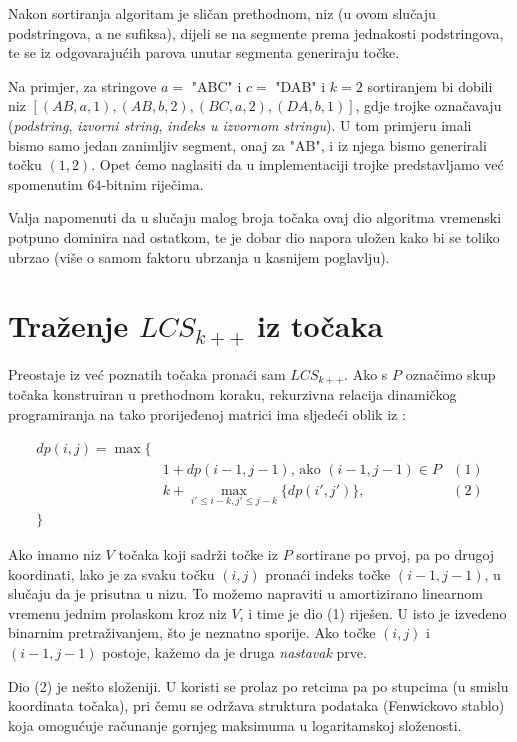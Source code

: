 \documentclass[times, utf8, seminar, numeric]{fer}
\begin{document}
Nakon sortiranja algoritam je sličan prethodnom, niz (u ovom slučaju
podstringova, a ne sufiksa), dijeli se na segmente prema jednakosti
podstringova, te se iz odgovarajućih parova unutar segmenta generiraju
točke.

Na primjer, za stringove $a =$ "ABC" i $c =$ "DAB" i $k = 2$
sortiranjem bi dobili niz $[(AB, a, 1), (AB, b, 2), (BC, a, 2), (DA,
  b, 1)]$, gdje trojke označavaju (\emph{podstring}, \emph{izvorni
  string}, \emph{indeks u izvornom stringu}). U tom primjeru imali
bismo samo jedan zanimljiv segment, onaj za "AB", i iz njega bismo
generirali točku $(1, 2)$. Opet ćemo naglasiti da u implementaciji
trojke predstavljamo već spomenutim $64$-bitnim riječima.

Valja napomenuti da u slučaju malog broja točaka ovaj dio algoritma
vremenski potpuno dominira nad ostatkom, te je dobar dio napora uložen
kako bi se toliko ubrzao (više o samom faktoru ubrzanja u kasnijem
poglavlju).

\section{Traženje $LCS_{k++}$ iz točaka}
Preostaje iz već poznatih točaka pronaći sam $LCS_{k++}$. Ako s $P$
označimo skup točaka konstruiran u prethodnom koraku, rekurzivna
relacija dinamičkog programiranja na tako prorijeđenoj matrici ima
sljedeći oblik iz \cite{Pavetic}:

\begin{align*}
  dp(i, j) = \max\{ \\
  &1 + dp(i-1, j-1) \text{, ako } (i-1, j-1) \in P     &       (1)\\
  &k + \max_{i' \le i - k, j' \le j - k}\{dp(i', j')\},    &      (2) \\ 
  \}
\end{align*}
  
Ako imamo niz $V$ točaka koji sadrži točke iz $P$ sortirane po prvoj,
pa po drugoj koordinati, lako je za svaku točku $(i, j)$ pronaći
indeks točke $(i-1, j-1)$, u slučaju da je prisutna u nizu. To možemo
napraviti u amortizirano linearnom vremenu jednim prolaskom kroz niz
$V$, i time je dio (1) riješen. U \cite{Pavetic} isto je izvedeno
binarnim pretraživanjem, što je neznatno sporije. Ako točke $(i, j)$ i
$(i-1, j-1)$ postoje, kažemo da je druga \emph{nastavak} prve.

Dio (2) je nešto složeniji. U \cite{Pavetic} koristi se prolaz po retcima
pa po stupcima (u smislu koordinata točaka), pri čemu se održava
struktura podataka (Fenwickovo stablo) koja omogućuje računanje gornjeg
maksimuma u logaritamskoj složenosti. 
\end{document}
